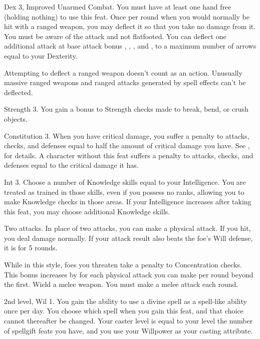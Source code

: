\featpres Dex 3, Improved Unarmed Combat.
\featben You must have at least one hand free (holding nothing) to use this feat.
Once per round when you would normally be hit with a ranged weapon, you may deflect it so that you take no damage from it.
You must be aware of the attack and not flatfooted.
You can deflect one additional attack at base attack bonus , , , and , to a maximum number of arrows equal to your Dexterity.
\par Attempting to deflect a ranged weapon doesn't count as an action.
Unusually massive ranged weapons and ranged attacks generated by spell effects can't be deflected.

\featpre Strength 3.
\featben You gain a  bonus to Strength checks made to break, bend, or crush objects.

\featpre Constitution 3.
\featben When you have critical damage, you suffer a penalty to attacks, checks, and defenses equal to half the amount of critical damage you have.
See , for details.
A character without this feat suffers a penalty to attacks, checks, and defenses equal to the critical damage it has.

\featpre Int 3.
\featben Choose a number of Knowledge skills equal to your Intelligence.
You are treated as trained in those skills, even if you possess no ranks, allowing you to make Knowledge checks in those areas.
If your Intelligence increases after taking this feat, you may choose additional Knowledge skills.

\featpre Two attacks.
\featben In place of two attacks, you can make a physical attack.
If you hit, you deal damage normally.
If your attack result also beats the foe's Will defense, it is \disoriented for 5 rounds.

\featben While in this style, foes you threaten take a  penalty to Concentration checks.
This bonus increases by  for each physical attack you can make per round beyond the first.
\stylereq Wield a melee weapon. You must make a melee attack each round.

\featpres 2nd level, Wil 1.
\featben You gain the ability to use a divine spell as a spell-like ability once per day.
You choose which spell when you gain this feat, and that choice cannot thereafter be changed.
Your caster level is equal to your level \add the number of spellgift feats you have, and you use your Willpower as your casting attribute.

